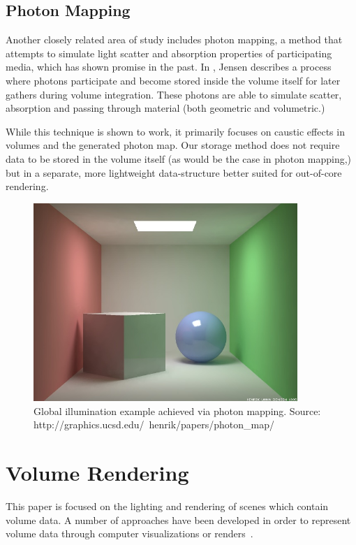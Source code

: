 \documentclass[12pt]{ucthesis}
\begin{document}
\subsection{Photon Mapping}
Another closely related area of study includes photon mapping, a method that attempts to simulate light scatter and absorption properties of participating media, which has shown promise in the past.  In \cite{jensen:1998}, Jensen describes a process where photons participate and become stored inside the volume itself for later gathers during volume integration.  These photons are able to simulate scatter, absorption and passing through material (both geometric and volumetric.)

While this technique is shown to work, it primarily focuses on caustic effects in volumes and the generated photon map.  Our storage method does not require data to be stored in the volume itself (as would be the case in photon mapping,) but in a separate, more lightweight data-structure better suited for out-of-core rendering.

\begin{figure}[h!]
    \centering
    \includegraphics[width=100mm]{img/external/ewr7_mcbox.jpg}
    \caption{Global illumination example achieved via photon mapping.  Source: http://graphics.ucsd.edu/\string~henrik/papers/photon\_map/}
    \label{fig:photon}
\end{figure}

\section{Volume Rendering}
This paper is focused on the lighting and rendering of scenes which contain volume data.  A number of approaches have been developed in order to represent volume data through computer visualizations or renders~\cite{levoy88}\cite{Kajiya84}.
\end{document}
